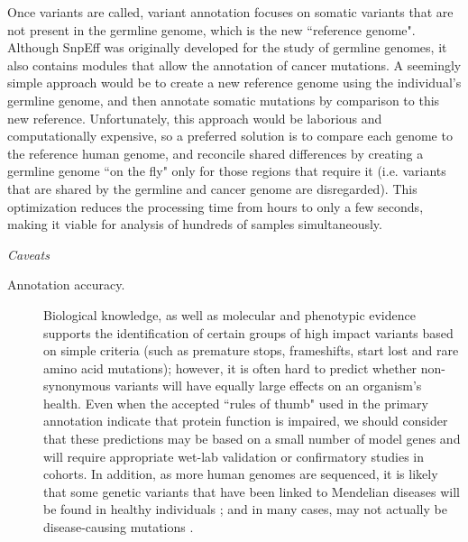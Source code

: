 Once variants are called, variant annotation focuses on somatic variants that are not present in the germline genome, which is the new ``reference genome". Although SnpEff was originally developed for the study of germline genomes, it also contains modules that allow the annotation of cancer mutations. A seemingly simple approach would be to create a new reference genome using the individual’s germline genome, and then annotate somatic mutations by comparison to this new reference. Unfortunately, this approach would be laborious and computationally expensive, so a preferred solution is to compare each genome to the reference human genome, and reconcile shared differences by creating a germline genome ``on the fly" only for those regions that require it (i.e. variants that are shared by the germline and cancer genome are disregarded). This optimization reduces the processing time from hours to only a few seconds, making it viable for analysis of hundreds of samples simultaneously.

\textit{Caveats}

	\begin{description}

	\item[Annotation accuracy.] Biological knowledge, as well as molecular and phenotypic evidence supports the identification of certain groups of high impact variants based on simple criteria (such as premature stops, frameshifts, start lost and rare amino acid mutations); however, it is often hard to predict whether non-synonymous variants will have equally large effects on an organism's health. Even when the accepted ``rules of thumb" used in the primary annotation indicate that protein function is impaired, we should consider that these predictions may be based on a small number of model genes and will require appropriate wet-lab validation or confirmatory studies in cohorts. In addition, as more human genomes are sequenced, it is likely that some genetic variants that have been linked to Mendelian diseases will be found in healthy individuals  \cite{REF65}; and in many cases, may not actually be disease-causing mutations  \cite{REF66}.
	
	\end{description}

